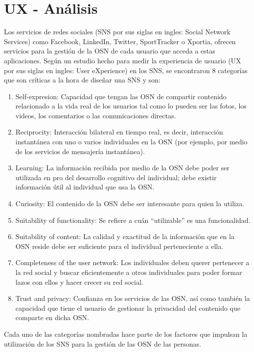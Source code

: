 \section{UX - Análisis}
Los servicios de redes sociales (SNS por sus siglas en ingles: Social Network Services) como Facebook, LinkedIn, Twitter, SportTracker o Xportia, ofrecen servicios para la gestión de la OSN de cada usuario que acceda a estas aplicaciones. Según un estudio hecho para medir la experiencia de usuario \cite{user_behavior_online} (UX por sus siglas en ingles: User eXperience) en los SNS, se encontraron 8 categorías que son críticas a la hora de diseñar una SNS y son:

\begin{enumerate}
  \item Self-expresion: Capacidad que tengan las OSN de compartir contenido relacionado a la vida real de los usuarios tal como lo pueden ser las fotos, los videos, los comentarios o las comunicaciones directas.
  \item Reciprocity: Interacción bilateral en tiempo real, es decir, interacción instantánea con uno o varios individuales en la OSN (por ejemplo, por medio de los servicios de mensajería instantánea).
  \item Learning: La información recibida por medio de la OSN debe poder ser utilizada en pro del desarrollo cognitivo del individual; debe existir información útil al individual que usa la OSN.
  \item Curiosity: El contenido de la OSN debe ser interesante para quien la utiliza.
  \item Suitability of functionality: Se refiere a cuán ``utilizable'' es una funcionalidad.
  \item Suitability of content: La calidad y exactitud de la información que en la OSN reside debe ser suficiente para el individual perteneciente a ella.
  \item Completeness of the user network: Los individuales deben querer pertenecer a la red social y buscar eficientemente a otros individuales para poder formar lazos con ellos y hacer crecer su red social.
  \item Trust and privacy: Confianza en los servicios de las OSN, así como también la capacidad que tiene el usuario de gestionar la privacidad del contenido que comparte en dicha OSN. \cite{social_experience}
\end{enumerate}

Cada uno de las categorías nombradas hace parte de los factores que impulsan la utilización de los SNS para la gestión de las OSN de las personas.
